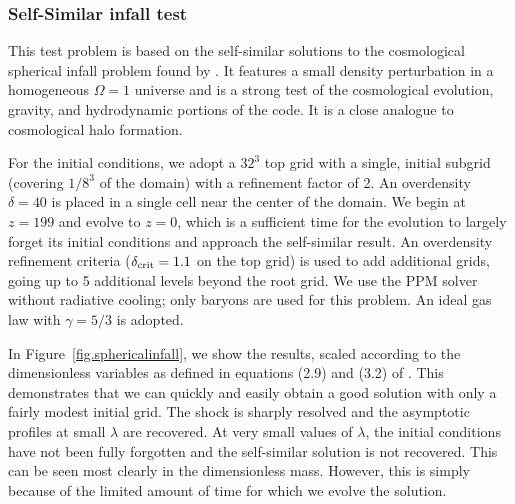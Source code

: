 \subsubsection{Self-Similar infall test}
\label{sec.tests.infall}

This test problem is based on the self-similar solutions to the
cosmological spherical infall problem found
by \citet{Bertschinger1985}.  It features a small density perturbation
in a homogeneous $\Omega = 1$ universe and is a strong test of the
cosmological evolution, gravity, and hydrodynamic portions of the
code.  It is a close analogue to cosmological halo formation.

For the initial conditions, we adopt a $32^3$ top grid with a single,
initial subgrid (covering $1/8^3$ of the domain) with a refinement
factor of 2.  An overdensity $\delta = 40$ is placed in a single cell
near the center of the domain.  We begin at $z=199$ and evolve to
$z=0$, which is a sufficient time for the evolution to largely forget
its initial conditions and approach the self-similar result.  An
overdensity refinement criteria ($\delta_{\rm crit} = 1.1$ on the top
grid) is used to add additional grids, going up to 5 additional levels
beyond the root grid.  We use the PPM solver without radiative
cooling; only baryons are used for this problem.  An ideal gas law
with $\gamma = 5/3$ is adopted.

In Figure~\ref{fig.sphericalinfall}, we show the results, scaled
according to the dimensionless variables as defined in equations (2.9)
and (3.2) of \citet{Bertschinger1985}.  This demonstrates that we can
quickly and easily obtain a good solution with only a fairly modest
initial grid.  The shock is sharply resolved and the asymptotic
profiles at small $\lambda$ are recovered.  At very small values of
$\lambda$, the initial conditions have not been fully forgotten and
the self-similar solution is not recovered.  This can be seen most
clearly in the dimensionless mass.  However, this is simply because of
the limited amount of time for which we evolve the solution.


